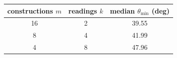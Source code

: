 \begin{tabular}{ccc}
\toprule
constructions $m$ & readings $k$ & median $\theta_{\min}$ (deg) \\
\midrule
16 & 2 & 39.55 \\
8 & 4 & 41.99 \\
4 & 8 & 47.96 \\
\bottomrule
\end{tabular}
